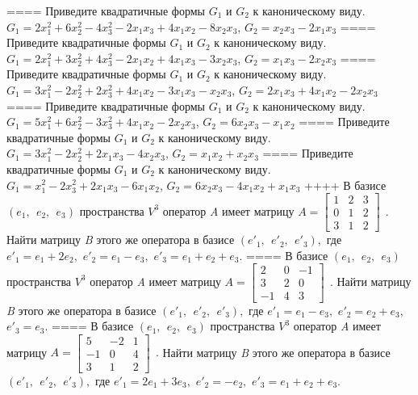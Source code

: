 ====
Приведите квадратичные формы \(G_{1}\) и \(G_{2}\) к каноническому виду. \(G_{1} = 2x_{1}^{2} + 6x_{2}^{2} - 4x_{3}^{2} - 2x_{1}x_{3} + 4x_{1}x_{2} - 8x_{2}x_{3}\), \(G_{2} = x_{2}x_{3} - 2x_{1}x_{3}\)
====
Приведите квадратичные формы \(G_{1}\) и \(G_{2}\) к каноническому виду. \(G_{1} = 2x_{1}^{2} + 3x_{2}^{2} + 4x_{3}^{2} - 2x_{1}x_{2} + 4x_{1}x_{3} - 3x_{2}x_{3}\), \(G_{2} = x_{1}x_{3} - 2x_{2}x_{3}\)
====
Приведите квадратичные формы \(G_{1}\) и \(G_{2}\) к каноническому виду. \(G_{1} = 3x_{1}^{2} - 2x_{2}^{2} + 2x_{3}^{2} + 4x_{1}x_{2} - 3x_{1}x_{3} - x_{2}x_{3}\), \(G_{2} = 2x_{1}x_{3} + 4x_{1}x_{2} - 2x_{2}x_{3}\)
====
Приведите квадратичные формы \(G_{1}\) и \(G_{2}\) к каноническому виду. \(G_{1} = 5x_{1}^{2} + 6x_{2}^{2} - 3x_{3}^{2} + 4x_{1}x_{2} - 2x_{2}x_{3}\), \(G_{2} = 6x_{2}x_{3} - x_{1}x_{2}\)
====
Приведите квадратичные формы \(G_{1}\) и \(G_{2}\) к каноническому виду. \(G_{1} = 3x_{1}^{2} - 2x_{2}^{2} + 2x_{1}x_{3} - 4x_{2}x_{3}\), \(G_{2} = x_{1}x_{2} + x_{2}x_{3}\)
====
Приведите квадратичные формы \(G_{1}\) и \(G_{2}\) к каноническому виду. \(G_{1} = x_{1}^{2} - 2x_{3}^{2} + 2x_{1}x_{3} - 6x_{1}x_{2}\), \(G_{2} = 6x_{2}x_{3} - 4x_{1}x_{2} + x_{1}x_{3}\)
++++
В базисе \((e_{1},\ \ e_{2},\ \ e_{3})\) пространства \(V^{3}\) оператор \emph{A} имеет матрицу \(A = \begin{bmatrix}
1 & 2 & 3 \\
0 & 1 & 2 \\
3 & 1 & 2
\end{bmatrix}\ \ .\) Найти матрицу \emph{B} этого же оператора в базисе \(({e'}_{1},\ \ {e'}_{2},\ \ {e'}_{3}),\) где \({e'}_{1} = e_{1} + 2e_{2},\) \({e'}_{2} = e_{1} - e_{3},\) \({e'}_{3} = e_{1} + e_{2} + e_{3}.\)
====
В базисе \((e_{1},\ \ e_{2},\ \ e_{3})\) пространства \(V^{3}\) оператор \emph{A} имеет матрицу \(A = \begin{bmatrix}
2 & 0 & - 1 \\
3 & 2 & 0 \\
 - 1 & 4 & 3
\end{bmatrix}\ \ .\) Найти матрицу \emph{B} этого же оператора в базисе \(({e'}_{1},\ \ {e'}_{2},\ \ {e'}_{3}),\) где \({e'}_{1} = e_{1} - e_{3},\) \({e'}_{2} = e_{2} + e_{3},\) \({e'}_{3} = e_{3}.\)
====
В базисе \((e_{1},\ \ e_{2},\ \ e_{3})\) пространства \(V^{3}\) оператор \emph{A} имеет матрицу \(A = \begin{bmatrix}
5 & - 2 & 1 \\
 - 1 & 0 & 4 \\
3 & 1 & 2
\end{bmatrix}\ \ .\) Найти матрицу \emph{B} этого же оператора в базисе \(({e'}_{1},\ \ {e'}_{2},\ \ {e'}_{3}),\) где \({e'}_{1} = 2e_{1} + 3e_{3},\) \({e'}_{2} = - e_{2},\) \({e'}_{3} = e_{1} + e_{2} + e_{3}.\)
